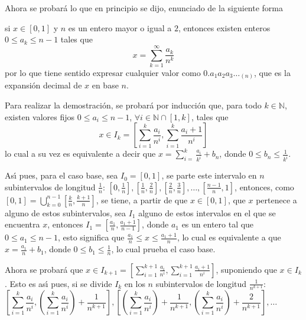\begin{solucion}
\begin{demostracion}
 \end{demostracion}
 Ahora se probar\'a lo que en principio se dijo, enunciado de la siguiente forma
 \begin{teorema}
  si $x\in[0,1]$ y $n$ es un entero mayor o igual a $2$, entonces existen enteros $0\leq a_k \leq n-1$ tales que
  \begin{equation*}
   x = \sum_{k=1}^{\infty} \frac{a_k}{n^k}
  \end{equation*}
  por lo que tiene sentido expresar cualquier valor como $0.a_1a_2a_3\ldots_{(n)}$, que es la expansi\'on decimal de $x$ en base $n$.
 \end{teorema}
 \begin{demostracion}
  Para realizar la demostraci\'on, se probar\'a por inducci\'on que, para todo $k \in \mathbb{N}$, existen valores fijos $0 \leq a_i \leq n-1$, $\forall i\in\mathbb{N}\cap[1,k]$, tales que
  \begin{equation*}
   x \in I_k = \left[ \sum_{i=1}^{k} \frac{a_i}{n^i}, \sum_{i=1}^{k} \frac{a_i + 1}{n^i} \right]
  \end{equation*}
  lo cual a su vez es equivalente a decir que $x = \sum_{i=}^{k} \frac{a_i}{k^i} + b_n$, donde $0 \leq b_n \leq \frac{1}{k^i}$.
  \par 
  As\'{\i} pues, para el caso base, sea $I_0 = [0,1]$, se parte este intervalo en $n$ subintervalos de longitud $\frac{1}{n}$: $\left[ 0, \frac{1}{n} \right], \left[ \frac{1}{n}, \frac{2}{n} \right], \left[ \frac{2}{n}, \frac{3}{n} \right], \ldots, \left[ \frac{n-1}{n}, 1 \right]$, entonces, como $[0,1] = \bigcup_{k=0}^{n-1} \left[ \frac{k}{n}, \frac{k+1}{n} \right]$, se tiene, a partir de que $x \in [0,1]$, que $x$ pertenece a alguno de estos subintervalos, sea $I_1$ alguno de estos intervalos en el que se encuentra $x$, entonces $I_1 = \left[ \frac{a_1}{n}, \frac{a_1 + 1}{n-1} \right]$, donde $a_1$ es un entero tal que $0 \leq a_1 \leq n-1$, esto significa que $\frac{a_1}{n} \leq x \leq \frac{a_1 + 1}{n}$, lo cual es equivalente a que $x = \frac{a_1}{n} + b_1$, donde $0 \leq b_1 \leq \frac{1}{n}$, lo cual prueba el caso base.
  \par 
  Ahora se probar\'a que $x \in I_{k+1} = \left[ \sum_{i=1}^{k+1} \frac{a_i}{n^i}, \sum_{i=1}^{k+1} \frac{a_i + 1}{n^i} \right]$, suponiendo que $x\in I_{k}$. Esto es as\'{\i} pues, si se divide $I_{k}$ en los $n$ subintervalos de longitud $\frac{1}{n^{k+1}}$:
  \begin{equation*}
   \left[ \sum_{i=1}^{k} \frac{a_i}{n^i}, \left( \sum_{i=1}^{k} \frac{a_i}{n^i} \right) + \frac{1}{n^{k+1}} \right], \left[ \left( \sum_{i=1}^{k} \frac{a_i}{n^i} \right) + \frac{1}{n^{k+1}}, \left( \sum_{i=1}^{k} \frac{a_i}{n^i} \right) + \frac{2}{n^{k+1}} \right], \ldots \hspace{2cm}

\end{equation*}
\end{demostracion}
\end{solucion}
